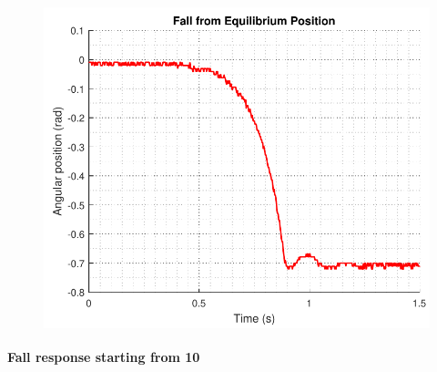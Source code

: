 \begin{minipage}{\linewidth}
\begin{minipage}{0.45\linewidth}
\begin{figure}[H]
			\includegraphics[scale=.53]{figures/FallRad}
			\centering
			\vspace{-.4cm}
			\captionsetup{justification=centering}
			\label{FallRad}
		\end{figure}\vspace{-5mm}
	\end{minipage}
\end{minipage} 

\small\textbf{Fall response starting from \si{10^\circ}}

